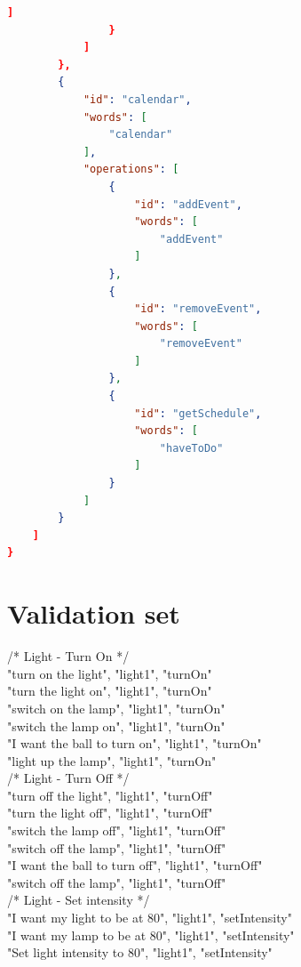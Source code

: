 \documentclass[twoside]{supsistudent}
\begin{document}
\begin{appendices}
\begin{lstlisting}[language=json,firstnumber=1]
                    ]
                }
            ]
        },
        {
            "id": "calendar",
            "words": [
                "calendar"
            ],
            "operations": [
                {
                    "id": "addEvent",
                    "words": [
                        "addEvent"
                    ]
                },
                {
                    "id": "removeEvent",
                    "words": [
                        "removeEvent"
                    ]
                },
                {
                    "id": "getSchedule",
                    "words": [
                        "haveToDo"
                    ]
                }
            ]
        }
    ]
}
\end{lstlisting}
\chapter{Validation set}
	/*
        Light - Turn On
         */\\
	"turn on the light", "light1", "turnOn"\\
        "turn the light on", "light1", "turnOn"\\
        "switch on the lamp", "light1", "turnOn"\\
        "switch the lamp on", "light1", "turnOn"\\
        "I want the ball to turn on", "light1", "turnOn"\\
        "light up the lamp", "light1", "turnOn"\\
         /*
        Light - Turn Off
         */\\
        "turn off the light", "light1", "turnOff"\\
        "turn the light off", "light1", "turnOff"\\
        "switch the lamp off", "light1", "turnOff"\\
        "switch off the lamp", "light1", "turnOff"\\
        "I want the ball to turn off", "light1", "turnOff"\\
        "switch off the lamp", "light1", "turnOff"\\
         /*
        Light - Set intensity
         */\\
        "I want my light to be at 80", "light1", "setIntensity"\\
        "I want my lamp to be at 80", "light1", "setIntensity"\\
        "Set light intensity to 80", "light1", "setIntensity"\\

\end{appendices}
\end{document}
